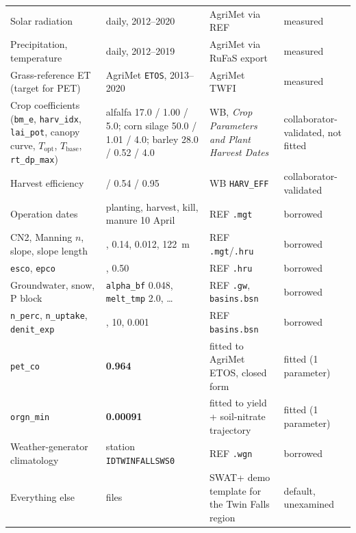 \documentclass[a4paper,fleqn]{cas-sc}
\begin{document}
\begin{table}[t]
\begin{tabular*}{\tblwidth}{@{}>{\raggedright\arraybackslash}p{}>{\raggedright\arraybackslash}p{}>{\raggedright\arraybackslash}p{}>{\raggedright\arraybackslash}p{}@{}}
Solar radiation & daily, 2012--2020 & AgriMet via REF & measured \\
Precipitation, temperature & daily, 2012--2019 & AgriMet via RuFaS export & measured \\
Grass-reference ET (target for PET) & AgriMet \texttt{ETOS}, 2013--2020 & AgriMet TWFI \citep{agrimet} & measured \\
Crop coefficients (\texttt{bm\_e}, \texttt{harv\_idx}, \texttt{lai\_pot}, canopy curve, $T_\mathrm{opt}$, $T_\mathrm{base}$, \texttt{rt\_dp\_max}) & alfalfa 17.0 / 1.00 / 5.0; corn silage 50.0 / 1.01 / 4.0; barley 28.0 / 0.52 / 4.0 & WB, \emph{Crop Parameters and Plant Harvest Dates} & collaborator-validated, not fitted \\
Harvest efficiency & 0.98 / 0.54 / 0.95 & WB \texttt{HARV\_EFF} & collaborator-validated \\
Operation dates & planting, harvest, kill, manure 10 April & REF \texttt{.mgt} & borrowed \\
CN2, Manning $n$, slope, slope length & 75, 0.14, 0.012, 122~m & REF \texttt{.mgt}/\texttt{.hru} & borrowed \\
\texttt{esco}, \texttt{epco} & 0.95, 0.50 & REF \texttt{.hru} & borrowed \\
Groundwater, snow, P block & \texttt{alpha\_bf} 0.048, \texttt{melt\_tmp} 2.0, \ldots & REF \texttt{.gw}, \texttt{basins.bsn} & borrowed \\
\texttt{n\_perc}, \texttt{n\_uptake}, \texttt{denit\_exp} & 0.20, 10, 0.001 & REF \texttt{basins.bsn} & borrowed \\
\texttt{pet\_co} & \textbf{0.964} & fitted to AgriMet ETOS, closed form & fitted (1 parameter) \\
\texttt{orgn\_min} & \textbf{0.00091} & fitted to yield + soil-nitrate trajectory & fitted (1 parameter) \\
Weather-generator climatology & station \texttt{IDTWINFALLSWS0} & REF \texttt{.wgn} & borrowed \\
Everything else & 38 files & SWAT+ demo template for the Twin Falls region & default, unexamined \\
\bottomrule
\end{tabular*}
\end{table}
\end{document}
